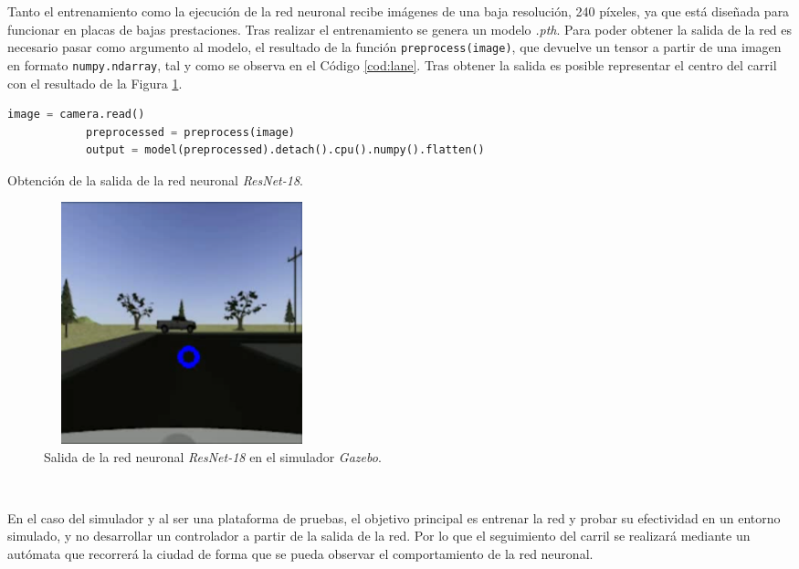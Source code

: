 Tanto el entrenamiento como la ejecución de la red neuronal recibe imágenes de una baja resolución, 240 píxeles, ya que está diseñada para funcionar en placas de bajas
prestaciones. Tras realizar el entrenamiento se genera un modelo \textit{.pth}. Para poder obtener la salida de la red es necesario pasar como argumento al modelo, el resultado de
la función \verb|preprocess(image)|, que devuelve un tensor a partir de una imagen en formato \verb|numpy.ndarray|, tal y como se observa en el Código \ref{cod:lane}. Tras obtener
la salida es posible representar el centro del carril con el resultado de la Figura \ref{fig:outputnnsim}.\\

\begin{code}[h]
	\begin{lstlisting}[language=Python]
			image = camera.read()
    		preprocessed = preprocess(image)
    		output = model(preprocessed).detach().cpu().numpy().flatten()
	\end{lstlisting}
	\caption[Obtención de la salida de la red neuronal \textit{ResNet-18}.]{Obtención de la salida de la red neuronal \textit{ResNet-18}.}
	\label{cod:lane}
\end{code}

\begin{figure} [h!]
	\begin{center}
		\includegraphics[width=8cm, height=7cm]{figs/outputNNsim}
	\end{center}
	\caption{Salida de la red neuronal \textit{ResNet-18} en el simulador \textit{Gazebo}.}
	\label{fig:outputnnsim}
\end{figure}\

En el caso del simulador y al ser una plataforma de pruebas, el objetivo principal es entrenar la red y probar su efectividad en un entorno simulado, y no desarrollar un
controlador a partir de la salida de la red. Por lo que el seguimiento del carril se realizará mediante un autómata que recorrerá la ciudad de forma que se pueda observar el
comportamiento de la red neuronal.\\

